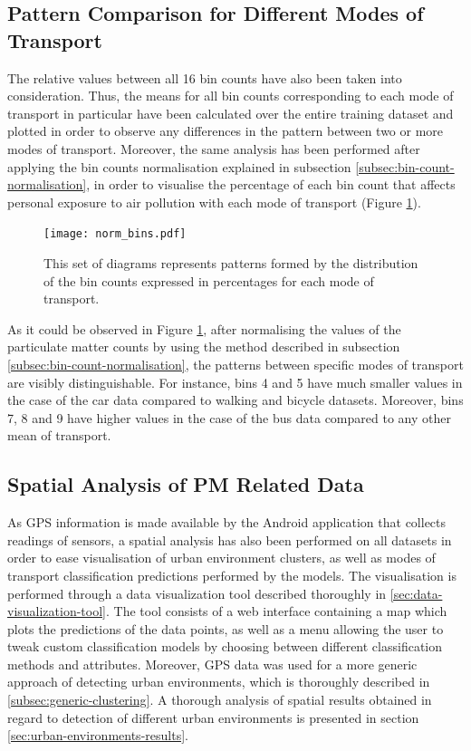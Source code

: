 \documentclass[bsc,frontabs,twoside,singlespacing, parskip,deptreport]{infthesis}     %
\begin{document}
\subsection{Pattern Comparison for Different Modes of Transport}

The relative values between all 16 bin counts have also been taken into consideration. Thus, the means for all bin counts corresponding to each mode of transport in particular have been calculated over the entire training dataset and plotted in order to observe any differences in the pattern between two or more modes of transport. Moreover, the same analysis has been performed after applying the bin counts normalisation explained in subsection \ref{subsec:bin-count-normalisation}, in order to visualise the percentage of each bin count that affects personal exposure to air pollution with each mode of transport (Figure \ref{fig:norm-bins}).

\begin{figure}[h!]
  \center
  \texttt{[image: norm\_bins.pdf]} 
  \caption{This set of diagrams represents patterns formed by the distribution of the bin counts expressed in percentages for each mode of transport.}
  \label{fig:norm-bins}
\end{figure}

As it could be observed in Figure \ref{fig:norm-bins}, after normalising the values of the particulate matter counts by using the method described in subsection \ref{subsec:bin-count-normalisation}, the patterns between specific modes of transport are visibly distinguishable. For instance, bins 4 and 5 have much smaller values in the case of the car data compared to walking and bicycle datasets. Moreover, bins 7, 8 and 9 have higher values in the case of the bus data compared to any other mean of transport.

\subsection{Spatial Analysis of PM Related Data}

As GPS information is made available by the Android application that collects readings of sensors, a spatial analysis has also been performed on all datasets in order to ease visualisation of urban environment clusters, as well as modes of transport classification predictions performed by the models. The visualisation is performed through a data visualization tool described thoroughly in \ref{sec:data-visualization-tool}. The tool consists of a web interface containing a map which plots the predictions of the data points, as well as a menu allowing the user to tweak custom classification models by choosing between different classification methods and attributes. Moreover, GPS data was used for a more generic approach of detecting urban environments, which is thoroughly described in \ref{subsec:generic-clustering}. A thorough analysis of spatial results obtained in regard to detection of different urban environments is presented in section \ref{sec:urban-environments-results}.
\end{document}
